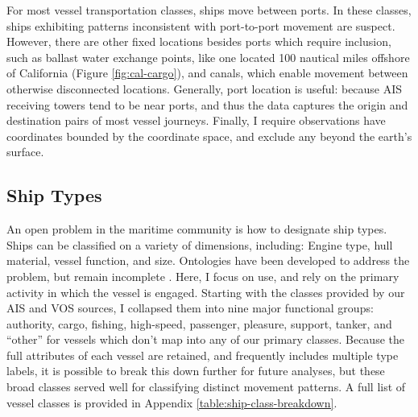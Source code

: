 For most vessel transportation classes, ships move between ports. In these classes, ships exhibiting patterns inconsistent with port-to-port movement are suspect.  However, there are other fixed locations besides ports which require inclusion, such as ballast water exchange points, like one located 100 nautical miles offshore of California (Figure \ref{fig:cal-cargo}), and canals, which enable movement between otherwise disconnected locations. Generally, port location is useful: because AIS receiving towers tend to be near ports, and thus the data captures the origin and destination pairs of most vessel journeys. Finally, I require observations have coordinates bounded by the coordinate space, and exclude any beyond the earth's surface.

\subsection{Ship Types}


An open problem in the maritime community is how to designate ship types. Ships can be classified on a variety of dimensions, including: Engine type, hull material, vessel function, and size. Ontologies have been developed to address the problem, but remain incomplete \citep{Vries2009}. Here, I focus on use, and rely on the primary activity in which the vessel is engaged. Starting with the classes provided by our AIS and VOS sources, I collapsed them into nine major functional groups: authority, cargo, fishing, high-speed, passenger, pleasure, support, tanker, and ``other'' for vessels which don't map into any of our primary classes. Because the full attributes of each vessel are retained, and frequently includes multiple type labels, it is possible to break this down further for future analyses, but these broad classes served well for classifying distinct movement patterns. A full list of vessel classes is provided in Appendix \ref{table:ship-class-breakdown}.

